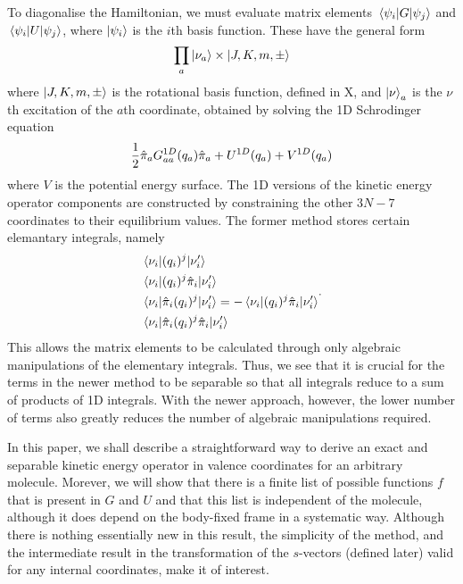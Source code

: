 \documentclass{article}
\begin{document}
To diagonalise the Hamiltonian, we must evaluate matrix elements $\matrixel{\psi_i}{G}{\psi_j}$ and $\matrixel{\psi_i}{U}{\psi_j}$, where $\ket{\psi_i}$ is the $i$th basis function. These have the general form
\[
 \prod_a \ket{\nu_a} \times \ket{J, K, m, \pm}
\]
where $\ket{J, K, m, \pm}$ is the rotational basis function, defined in X, and $\ket{\nu}_a$ is the $\nu$th excitation of the $a$th coordinate, obtained by solving the 1D Schrodinger equation
\[
\dfrac12 \hat{\pi}_a G^{\text 1D}_{aa}(q_a) \hat{\pi}_a + U^{\text 1D}(q_a) + V^{\text 1D}(q_a)
\]
where $V$ is the potential energy surface. The 1D versions of the kinetic energy operator components are constructed by constraining the other $3N-7$ coordinates to their equilibrium values. The former method stores certain elemantary integrals, namely \[ \begin{split}
	&\matrixel{\nu_i}{(q_i)^j}{\nu_i'} \\
	&\matrixel{\nu_i}{(q_i)^j\hat{\pi}_i}{\nu_i'} \\
	&\matrixel{\nu_i}{\hat{\pi}_i (q_i)^j}{\nu_i'} = - \matrixel{\nu_i}{(q_i)^j \hat{\pi}_i}{\nu_i'}\\
	&\matrixel{\nu_i}{\hat{\pi}_i (q_i)^j\hat{\pi}_i}{\nu_i'} \\
\end{split}.
\]
This allows the matrix elements to be calculated through only algebraic manipulations of the elementary integrals. Thus, we see that it is crucial for the terms in the newer method to be separable so that all integrals reduce to a sum of products of 1D integrals. With the newer approach, however, the lower number of terms also greatly reduces the number of algebraic manipulations required. 

In this paper, we shall describe a straightforward way to derive an exact and separable kinetic energy operator in valence coordinates for an arbitrary molecule. Morever, we will show that there is a finite list of possible functions $f$ that is present in $G$ and $U$ and that this list is independent of the molecule, although it does depend on the body-fixed frame in a systematic way. Although there is nothing essentially new in this result, the simplicity of the method, and the intermediate result in the transformation of the $s$-vectors (defined later) valid for any internal coordinates,  make it of interest.    
\end{document}
